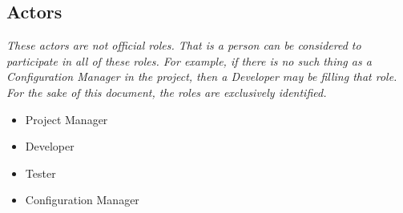 \documentclass[12pt,notitlepage]{article}
\begin{document}
\subsection{Actors}
\emph{These actors are not official roles. That is a person can be considered to
participate in all of these roles. For example, if there is no such thing as a Configuration
Manager in the project, then a Developer may be filling that role. For the sake of
this document, the roles are exclusively identified.}
\begin{itemize}
  \item Project Manager
  \item Developer
  \item Tester
  \item Configuration Manager
\end{itemize}
\end{document}
